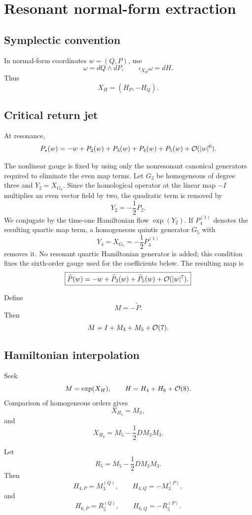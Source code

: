 \section{Resonant normal-form extraction}
\label{app:normal-form}

\subsection{Symplectic convention}

In normal-form coordinates \(w=(Q,P)\), use
\[
\boxed{
\omega=dQ\wedge dP,\qquad
\iota_{X_H}\omega=dH.
}
\]
Thus
\[
\boxed{
X_H=(H_P,-H_Q).
}
\]

\subsection{Critical return jet}

At resonance,
\[
P_\star(w)
=
-w+
P_2(w)+P_3(w)+P_4(w)+P_5(w)+\mathcal{O}(|w|^6).
\]

The nonlinear gauge is fixed by using only the nonresonant canonical generators required to eliminate the even map terms.  Let $G_3$ be homogeneous of degree three and $Y_2=X_{G_3}$.  Since the homological operator at the linear map $-I$ multiplies an even vector field by two, the quadratic term is removed by
\[
Y_2=-\frac12P_2.
\]
We conjugate by the time-one Hamiltonian flow $\exp(Y_2)$.  If $P_4^{(1)}$ denotes the resulting quartic map term, a homogeneous quintic generator $G_5$ with
\[
Y_4=X_{G_5}=-\frac12P_4^{(1)}
\]
removes it.  No resonant quartic Hamiltonian generator is added; this condition fixes the sixth-order gauge used for the coefficients below.  The resulting map is
\[
\boxed{
\widetilde P(w)
=
-w+\widetilde P_3(w)+\widetilde P_5(w)+\mathcal{O}(|w|^7).
}
\]

Define
\[
\boxed{
M=-\widetilde P.
}
\]
Then
\[
M=I+M_3+M_5+\mathcal{O}(7).
\]

\subsection{Hamiltonian interpolation}

Seek
\[
M=\exp(X_H),
\qquad
H=H_4+H_6+\mathcal{O}(8).
\]
Comparison of homogeneous orders gives
\[
\boxed{
X_{H_4}=M_3,
}
\]
and
\[
\boxed{
X_{H_6}
=
M_5-\frac12DM_3M_3.
}
\]

Let
\[
R_5=M_5-\frac12DM_3M_3.
\]
Then
\[
\boxed{
H_{4,P}=M_3^{(Q)},\qquad
H_{4,Q}=-M_3^{(P)},
}
\]
and
\[
\boxed{
H_{6,P}=R_5^{(Q)},\qquad
H_{6,Q}=-R_5^{(P)}.
}
\]

